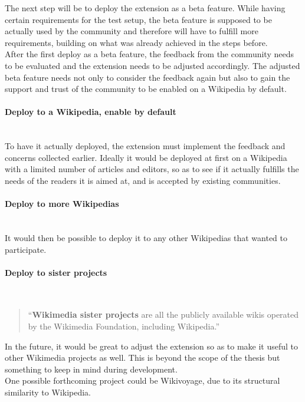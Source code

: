 The next step will be to deploy the extension as a beta feature. While having certain requirements for the test setup, the beta feature is supposed to be actually used by the community and therefore will have to fulfill more requirements, building on what was already achieved in the steps before. \\
After the first deploy as a beta feature, the feedback from the community needs to be evaluated and the extension needs to be adjusted accordingly. The adjusted beta feature needs not only to consider the feedback again but also to gain the support and trust of the community to be enabled on a Wikipedia by default.

\paragraph{Deploy to a Wikipedia, enable by default} ~\\
To have it actually deployed, the extension must implement the feedback and concerns collected earlier. Ideally it would be deployed at first on a Wikipedia with a limited number of articles and editors, so as to see if it actually fulfills the needs of the readers it is aimed at, and is accepted by existing communities.

\paragraph{Deploy to more Wikipedias} ~\\
It would then be possible to deploy it to any other Wikipedias that wanted to participate.

\paragraph{Deploy to sister projects} ~\\
\begin{quote}
``\textbf{Wikimedia sister projects} are all the publicly available wikis operated by the Wikimedia Foundation, including Wikipedia.'' \citep{wiki:29}
\end{quote}

In the future, it would be great to adjust the extension so as to make it useful to other Wikimedia projects as well. This is beyond the scope of the thesis but something to keep in mind during development. \\
One possible forthcoming project could be Wikivoyage, due to its structural similarity to Wikipedia.